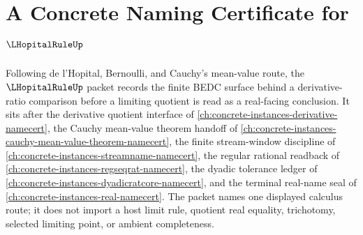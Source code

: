 \chapter{A Concrete Naming Certificate for $\LHopitalRuleUp$}
\label{ch:concrete-instances-lhopital-rule-namecert}

Following de l'Hopital, Bernoulli, and Cauchy's mean-value route, the $\LHopitalRuleUp$ packet records the finite BEDC surface behind a derivative-ratio comparison before a limiting quotient is read as a real-facing conclusion. It sits after the derivative quotient interface of \autoref{ch:concrete-instances-derivative-namecert}, the Cauchy mean-value theorem handoff of \autoref{ch:concrete-instances-cauchy-mean-value-theorem-namecert}, the finite stream-window discipline of \autoref{ch:concrete-instances-streamname-namecert}, the regular rational readback of \autoref{ch:concrete-instances-regseqrat-namecert}, the dyadic tolerance ledger of \autoref{ch:concrete-instances-dyadicratcore-namecert}, and the terminal real-name seal of \autoref{ch:concrete-instances-real-namecert}. The packet names one displayed calculus route; it does not import a host limit rule, quotient real equality, trichotomy, selected limiting point, or ambient completeness.

